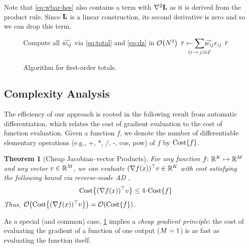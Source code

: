 \documentclass[11pt,a4paper]{article}
\newtheorem{thm}{Theorem}
\theoremstyle{definition}
\begin{document}
\noindent Note that \cref{eq:wbar-hes} also contains a term with $\nabla^2{\mathbf{L}}$ as it is derived from the product rule.
Since ${\mathbf{L}}$ is a linear construction, its second derivative is zero and so we can drop this term.

\begin{figure}[t!]
\begin{algorithmic}[1]


\State Compute all ${\widetilde{w_{ij}}}$ via \cref{eq:total} and \cref{eq:dz} in $\mathcal{O}\!\left({N}^3\right)$
\State $\rbar \gets {\displaystyle\smashoperator{\sum_{\edgeij\in\edges}}}
     \totalw{ij} \redge{ij}$ {\color{gray}\algorithmiccomment{ $\bigo{\nN^2\nRs}$ }} \label{line:rbar}
\State \Return ${\overline{r}}$
\EndFunc
\end{algorithmic}
\caption{Algorithm for first-order totals.
}
\label{fig:alg}
\end{figure}

\subsection{Complexity Analysis}\label{sec:runtime}
The efficiency of our approach is rooted in the following result from automatic differentiation, which relates the cost of gradient evaluation to the cost of function evaluation.
Given a function $f$, we denote the number of differentiable elementary operations (e.g., +, *, /, -, cos, pow) of $f$ by $\mathrm{Cost}\!\left\{ f \right\}$.
\begin{thm}[Cheap Jacobian--vector Products]
\label{thm:jvp}
For any function $f{:}\,\,\mathbb{R}^{{K}} \mapsto \mathbb{R}^{{M}}$
and any vector $v \in \mathbb{R}^{M}$, we can evaluate $(\nabla f(x))^\top v\in\mathbb{R}^{K}$ with cost satisfying the following bound via reverse-mode AD \citep[Page 44]{griewank-walther},
\begin{equation}
    \mathrm{Cost}\!\left\{ (\nabla f(x))^\top v \right\} \leq 4 \!\cdot\! \mathrm{Cost}\!\left\{ f \right\}
\end{equation}
Thus, $\mathcal{O}\!\left( \mathrm{Cost}\!\left\{ (\nabla f(x))^\top v \right\} \right) = \mathcal{O}\!\left( \mathrm{Cost}\!\left\{ f \right\} \right)$.
\end{thm}

As a special (and common) case, \cref{thm:jvp} implies a \emph{cheap gradient principle}: the cost of evaluating the gradient of a function of one output (${M}=1$) is as fast as evaluating the function itself.
\end{document}

